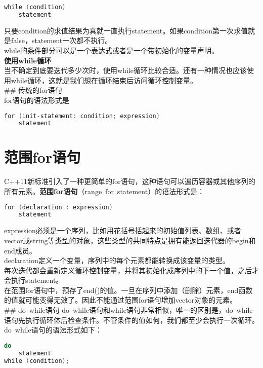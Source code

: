 \documentclass[
  a4paper,
  oneside,tablecaptionabove
]{scrbook}
\begin{document}
\begin{lstlisting}[language={C++}]
while (condition)
    statement
\end{lstlisting}

只要condition的求值结果为真就一直执行statement。如果condition第一次求值就是false，statement一次都不执行。\\
while的条件部分可以是一个表达式或者是一个带初始化的变量声明。\\
\textbf{使用while循环}\\
当不确定到底要迭代多少次时，使用while循环比较合适。还有一种情况也应该使用while循环，这就是我们想在循环结束后访问循环控制变量。\\
\#\# 传统的for语句\\
for语句的语法形式是

\begin{lstlisting}[language={C++}]
for (init-statement: condition; expression)
    statement
\end{lstlisting}

\section{范围for语句}\label{ux8303ux56f4forux8bedux53e5}

C++11新标准引入了一种更简单的for语句，这种语句可以遍历容器或其他序列的所有元素。\textbf{范围for语句}（range~for~statement）的语法形式是：

\begin{lstlisting}[language={C++}]
for (declaration : expression)
    statement
\end{lstlisting}

expression必须是一个序列，比如用花括号括起来的初始值列表、数组、或者vector或string等类型的对象，这些类型的共同特点是拥有能返回迭代器的begin和end成员。\\
declaration定义一个变量，序列中的每个元素都能转换成该变量的类型。\\
每次迭代都会重新定义循环控制变量，并将其初始化成序列中的下一个值，之后才会执行statement。\\
在范围for语句中，预存了end()的值。一旦在序列中添加（删除）元素，end函数的值就可能变得无效了。因此不能通过范围for语句增加vector对象的元素。\\
\#\# do~while语句
do~while语句和while语句非常相似，唯一的区别是，do~while语句先执行循环体后检查条件。不管条件的值如何，我们都至少会执行一次循环。do~while语句的语法形式如下：

\begin{lstlisting}[language={C++}]
do
    statement
while (condition);
\end{lstlisting}
\end{document}
